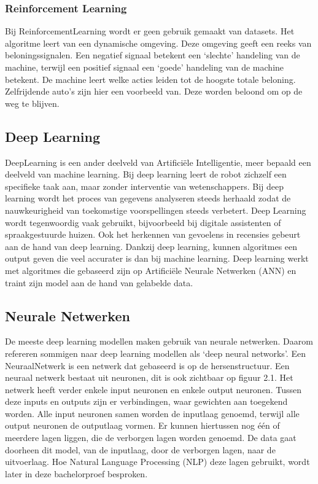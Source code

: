 \subsubsection{Reinforcement Learning}
\label{sec:reinforcementlearning}
Bij \gls{ReinforcementLearning} wordt er geen gebruik gemaakt van datasets. Het algoritme leert van een dynamische omgeving. Deze omgeving geeft een reeks van beloningssignalen. Een negatief signaal betekent een ‘slechte’ handeling van de machine, terwijl een positief signaal een ‘goede’ handeling van de machine betekent. De machine leert welke acties leiden tot de hoogste totale beloning. \autocite{Lievens2020} Zelfrijdende auto's zijn hier een voorbeeld van. Deze worden beloond om op de weg te blijven.
 
\subsection{Deep Learning}
\label{sec:deeplearning}
\gls{DeepLearning} is een ander deelveld van Artificiële Intelligentie, meer bepaald een deelveld van machine learning. Bij deep learning leert de robot zichzelf een specifieke taak aan, maar zonder interventie van wetenschappers. \autocite{IBM2020} Bij deep learning wordt het proces van gegevens analyseren steeds herhaald zodat de nauwkeurigheid van toekomstige voorspellingen steeds verbetert. Deep Learning wordt tegenwoordig vaak gebruikt, bijvoorbeeld bij digitale assistenten of spraakgestuurde huizen. \autocite{IBM2020}
Ook het herkennen van gevoelens in recensies gebeurt aan de hand van deep learning. 
Dankzij deep learning, kunnen algoritmes een output geven die veel accurater is dan bij machine learning. Deep learning werkt met algoritmes die gebaseerd zijn op Artificiële Neurale Netwerken (ANN) en traint zijn model aan de hand van gelabelde data.


\subsection{Neurale Netwerken}
\label{sec:neuralnetworks}

De meeste deep learning modellen maken gebruik van neurale netwerken. Daarom refereren sommigen naar deep learning modellen als ‘deep neural networks’. 
Een \gls{NeuraalNetwerk} is een netwerk dat gebaseerd is op de hersenstructuur. Een neuraal netwerk bestaat uit neuronen, dit is ook zichtbaar op figuur 2.1. Het netwerk heeft verder enkele input neuronen en enkele output neuronen. Tussen deze inputs en outputs zijn er verbindingen, waar gewichten aan toegekend worden. Alle input neuronen samen worden de inputlaag genoemd, terwijl alle output neuronen de outputlaag vormen. Er kunnen hiertussen nog één of meerdere lagen liggen, die de verborgen lagen worden genoemd. De data gaat doorheen dit model, van de inputlaag, door de verborgen lagen, naar de uitvoerlaag. Hoe Natural Language Processing (NLP) deze lagen gebruikt, wordt later in deze bachelorproef besproken. \autocite{Vervoort2017}

